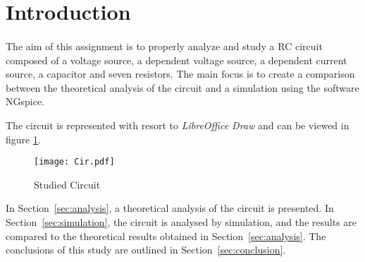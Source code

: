 \section{Introduction}
\label{sec:introduction}
\paragraph{}
\par The aim of this assignment is to properly analyze and study a RC circuit composed of a voltage source, a dependent voltage source, a dependent current source, a capacitor and seven resistors.
The main focus is to create a comparison between the theoretical analysis of the circuit and a simulation using the software NGspice.
\par 
\par The circuit is represented with resort to \textit{LibreOffice Draw} and can be viewed in figure \ref{circuit}.

\begin{figure}[H]
    \texttt{[image: Cir.pdf]}
    \centering
    \caption{Studied Circuit}
    \label{circuit}
\end{figure}


In Section~\ref{sec:analysis}, a theoretical analysis of the circuit is
presented. In Section~\ref{sec:simulation}, the circuit is analysed by
simulation, and the results are compared to the theoretical results obtained in
Section~\ref{sec:analysis}. The conclusions of this study are outlined in
Section~\ref{sec:conclusion}.
